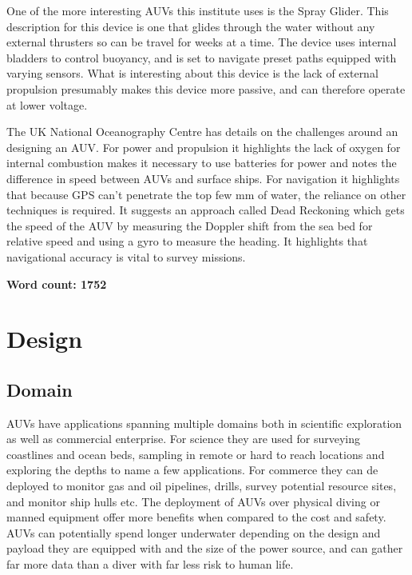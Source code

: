 \documentclass[11pt,a4paper,titlepage]{report}
\begin{document}
	One of the more interesting AUVs this institute uses is the Spray Glider\cite{WOODS_HOLE_SPRAY_GLIDER}. This description for this device is one that glides through the water without any external thrusters so can be travel for weeks at a time. The device uses internal bladders to control buoyancy, and is set to navigate preset paths equipped with varying sensors. What is interesting about this device is the lack of external propulsion presumably makes this device more passive, and can therefore operate at lower voltage.
	
	The UK National Oceanography Centre has details on the challenges around an designing an AUV\cite{NATIONAL_OCEANOGRAPHIC_AUTOSUBS}. For power and propulsion it highlights the lack of oxygen for internal combustion makes it necessary to use batteries for power and notes the difference in speed between AUVs and surface ships. For navigation it highlights that because GPS can't penetrate the top few mm of water, the reliance on other techniques is required. It suggests an approach called Dead Reckoning which gets the speed of the AUV by measuring the Doppler shift from the sea bed for relative speed and using a gyro to measure the heading. It highlights that navigational accuracy is vital to survey missions.
	
	\textbf{Word count: 1752}
	
	\chapter*{Design}
	\section*{Domain}
	AUVs have applications spanning multiple domains both in scientific exploration as well as commercial enterprise. For science they are used for surveying coastlines and ocean beds, sampling in remote or hard to reach locations and exploring the depths to name a few applications. For commerce they can de deployed to monitor gas and oil pipelines, drills, survey potential resource sites, and monitor ship hulls etc. The deployment of AUVs over physical diving or manned equipment offer more benefits when compared to the cost and safety. AUVs can potentially spend longer underwater depending on the design and payload they are equipped with and the size of the power source, and can gather far more data than a diver with far less risk to human life.
	
\end{document}

